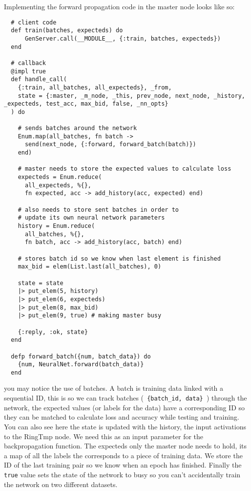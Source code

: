 Implementing the forward propagation code in the master node looks like so:
\begin{lstlisting}
  # client code
  def train(batches, expecteds) do
      GenServer.call(__MODULE__, {:train, batches, expecteds})
  end

  # callback
  @impl true
  def handle_call(
    {:train, all_batches, all_expecteds}, _from,
    state = {:master, _m_node, _this, prev_node, next_node, _history, _expecteds, test_acc, max_bid, false, _nn_opts}
  ) do

    # sends batches around the network
    Enum.map(all_batches, fn batch ->
      send(next_node, {:forward, forward_batch(batch)})
    end)

    # master needs to store the expected values to calculate loss
    expecteds = Enum.reduce(
      all_expecteds, %{},
      fn expected, acc -> add_history(acc, expected) end)

    # also needs to store sent batches in order to
    # update its own neural network parameters
    history = Enum.reduce(
      all_batches, %{},
      fn batch, acc -> add_history(acc, batch) end)

    # stores batch id so we know when last element is finished
    max_bid = elem(List.last(all_batches), 0)

    state = state
    |> put_elem(5, history)
    |> put_elem(6, expecteds)
    |> put_elem(8, max_bid)
    |> put_elem(9, true) # making master busy

    {:reply, :ok, state}
  end

  defp forward_batch({num, batch_data}) do
    {num, NeuralNet.forward(batch_data)}
  end
\end{lstlisting}
you may notice the use of batches. A batch is training data linked with a
sequential ID, this is so we can track batches (\lstinline| {batch_id, data} |)
through the network, the expected values (or labels for the data) have a
corresponding ID so they can be matched to calculate loss and accuracy while
testing and training. You can also see here the state is updated with the
history, the input activations to the RingTmp node. We need this as an input
parameter for the backpropagation function. The expecteds only the master node
needs to hold, its a map of all the labels the corresponds to a piece of
training data. We store the ID of the last training pair so we know when an
epoch has finished. Finally the \lstinline{true} value sets the state of the
network to busy so you can't accidentally train the network on two different
datasets.

